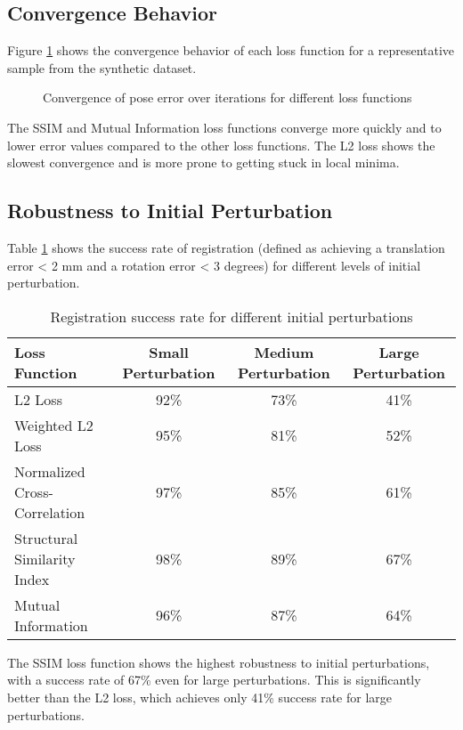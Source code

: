 \subsection{Convergence Behavior}
Figure \ref{fig:loss_convergence} shows the convergence behavior of each loss function for a representative sample from the synthetic dataset.

\begin{figure}[h]
\centering
\caption{Convergence of pose error over iterations for different loss functions}
\label{fig:loss_convergence}
\end{figure}

The SSIM and Mutual Information loss functions converge more quickly and to lower error values compared to the other loss functions. The L2 loss shows the slowest convergence and is more prone to getting stuck in local minima.

\subsection{Robustness to Initial Perturbation}
Table \ref{tab:loss_robustness} shows the success rate of registration (defined as achieving a translation error < 2 mm and a rotation error < 3 degrees) for different levels of initial perturbation.

\begin{table}[h]
\centering
\caption{Registration success rate for different initial perturbations}
\label{tab:loss_robustness}
\begin{tabular}{lccc}
\toprule
\textbf{Loss Function} & \textbf{Small Perturbation} & \textbf{Medium Perturbation} & \textbf{Large Perturbation} \\
\midrule
L2 Loss & 92\% & 73\% & 41\% \\
Weighted L2 Loss & 95\% & 81\% & 52\% \\
Normalized Cross-Correlation & 97\% & 85\% & 61\% \\
Structural Similarity Index & 98\% & 89\% & 67\% \\
Mutual Information & 96\% & 87\% & 64\% \\
\bottomrule
\end{tabular}
\end{table}

The SSIM loss function shows the highest robustness to initial perturbations, with a success rate of 67\% even for large perturbations. This is significantly better than the L2 loss, which achieves only 41\% success rate for large perturbations.

